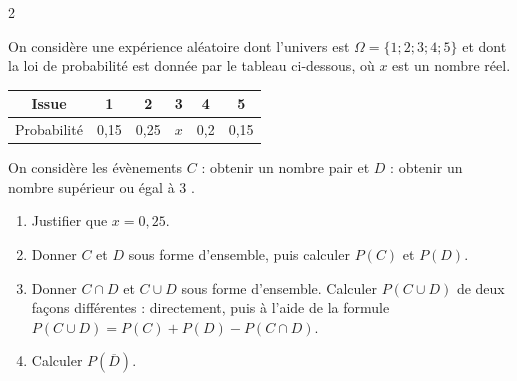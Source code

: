 \documentclass[10pt,a4paper]{article}
\begin{document}
\begin{multicols}{2}

\begin{exo}
On considère une expérience aléatoire dont l'univers est \(\Omega=\{1;2;3;4;5\}\) et dont la loi de probabilité est donnée par le tableau ci-dessous, où \(x\) est un nombre réel.

\smallskip

\begin{center}
\begin{tabular}{|c|c|c|c|c|c|}
    \hline
    Issue & 1 & 2 & 3 & 4 & 5 \\
    \hline
    Probabilité & 0,15 & 0,25 & \(x\) & 0,2 & 0,15 \\
    \hline
\end{tabular}
\end{center}

On considère les évènements \(C\) : \og obtenir un nombre pair \fg{} et \(D\) : \og obtenir un nombre supérieur ou égal à 3 \fg{}.

\begin{enumerate}[leftmargin=*]
    \item Justifier que \(x=0,25\).
    \item Donner \(C\) et \(D\) sous forme d'ensemble, puis calculer \(P(C)\) et \(P(D)\).
    \item Donner \(C\cap D\) et \(C\cup D\) sous forme d'ensemble. Calculer \(P(C\cup D)\) de deux façons différentes : directement, puis à l'aide de la formule \(P(C\cup D)=P(C)+P(D)-P(C\cap D)\).
    \item Calculer \(P(\overline{D})\).
\end{enumerate}
\end{exo}



\end{multicols}
\end{document}
